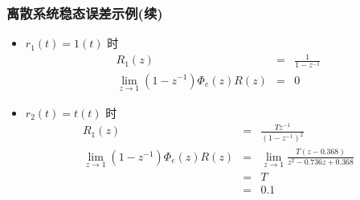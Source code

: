 \documentclass[table]{article}
\begin{document}
\begin{frame}
\frametitle{离散系统稳态误差示例(续)}
\label{sec-6-1-3}
\begin{itemize}

\item $r_1(t) =  1(t)$ 时\\
\label{sec-6-1-3-1}%
\begin{eqnarray*}
      R_1(z) &=& \frac{1}{1-z^{-1}} \\
      \lim_{z\rightarrow 1}(1-z^{-1})\Phi_e(z)R(z) &=& 0
      \end{eqnarray*}

\item $r_2(t) = t(t)$ 时\\
\label{sec-6-1-3-2}%
\begin{eqnarray*}
      R_1(z) &=& \frac{Tz^{-1}}{(1-z^{-1})^2} \\
      \lim_{z\rightarrow 1}(1-z^{-1})\Phi_e(z)R(z) &=& \lim_{z\rightarrow 1}\frac{T(z-0.368)}{z^2-0.736z+0.368}\\
       &=& T \\
       &=& 0.1
      \end{eqnarray*}
\end{itemize} %
\end{frame}
\end{document}
